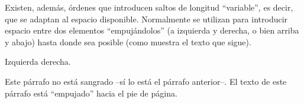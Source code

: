 \documentclass[a4paper]{report}
\begin{document}
Existen, además, órdenes que introducen saltos de longitud ``variable'', 
es decir, que se adaptan al espacio disponible. 
Normalmente se utilizan para introducir espacio entre dos elementos 
``empujándolos'' (a izquierda y derecha, o bien arriba y abajo) hasta donde sea posible (como muestra el texto que sigue). 

Izquierda \hfill derecha.

\vfill

\noindent
Este párrafo no está sangrado --sí lo está el párrafo anterior--. El texto de este párrafo está ``empujado'' hacia el pie de página.
\end{document}
